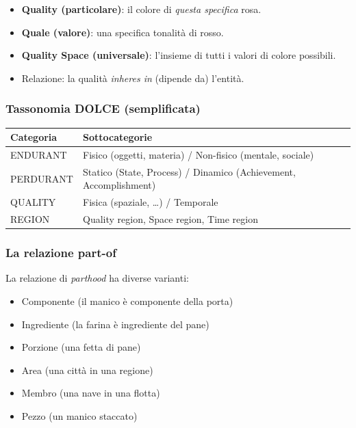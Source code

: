 \documentclass[12pt,a4paper]{article}
\begin{document}
\begin{itemize}[leftmargin=1.5em]
  \item \textbf{Quality (particolare)}: il colore di \emph{questa specifica} rosa.
  \item \textbf{Quale (valore)}: una specifica tonalità di rosso.
  \item \textbf{Quality Space (universale)}: l'insieme di tutti i valori di colore possibili.
  \item Relazione: la qualità \emph{inheres in} (dipende da) l'entità.
\end{itemize}

\subsubsection{Tassonomia DOLCE (semplificata)}

\begin{center}
\begin{tabular}{ll}
\toprule
\textbf{Categoria} & \textbf{Sottocategorie} \\
\midrule
ENDURANT & Fisico (oggetti, materia) / Non-fisico (mentale, sociale) \\
PERDURANT & Statico (State, Process) / Dinamico (Achievement, Accomplishment) \\
QUALITY & Fisica (spaziale, \ldots) / Temporale \\
REGION & Quality region, Space region, Time region \\
\bottomrule
\end{tabular}
\end{center}

\subsubsection{La relazione part-of}

La relazione di \emph{parthood} ha diverse varianti:
\begin{itemize}[leftmargin=1.5em, nosep]
  \item Componente (il manico è componente della porta)
  \item Ingrediente (la farina è ingrediente del pane)
  \item Porzione (una fetta di pane)
  \item Area (una città in una regione)
  \item Membro (una nave in una flotta)
  \item Pezzo (un manico staccato)
\end{itemize}
\end{document}
